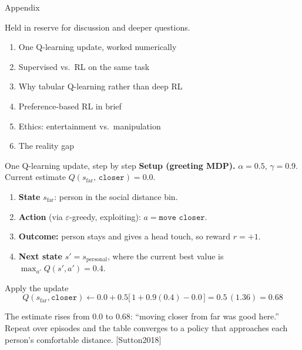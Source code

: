 \documentclass[aspectratio=169,10pt]{beamer}
\newcommand{\refnum}[1]{{\footnotesize\color{giuaccent}[#1]}}
\begin{document}
\begin{frame}{Appendix}
  \begin{center}
    \large Held in reserve for discussion and deeper questions.
  \end{center}
  \vspace{1em}
  \begin{enumerate}
    \item One Q-learning update, worked numerically
    \item Supervised vs.\ RL on the same task
    \item Why tabular Q-learning rather than deep RL
    \item Preference-based RL in brief
    \item Ethics: entertainment vs.\ manipulation
    \item The reality gap
  \end{enumerate}
\end{frame}

\begin{frame}{One Q-learning update, step by step}
  \footnotesize
  \textbf{Setup (greeting MDP).} $\alpha=0.5$, $\gamma=0.9$. Current estimate $Q(s_{\text{far}},\,\texttt{closer})=0.0$.
  \begin{enumerate}
    \item \textbf{State} $s_{\text{far}}$: person in the social distance bin.
    \item \textbf{Action} (via $\varepsilon$-greedy, exploiting): $a=\texttt{move closer}$.
    \item \textbf{Outcome:} person stays and gives a head touch, so reward $r=+1$.
    \item \textbf{Next state} $s'=s_{\text{personal}}$, where the current best value is $\max_{a'}Q(s',a')=0.4$.
  \end{enumerate}
  \vspace{0.3em}
  \begin{block}{Apply the update}
    \[
      Q(s_{\text{far}},\texttt{closer}) \leftarrow 0.0 + 0.5\big[\,1 + 0.9(0.4) - 0.0\,\big]
      = 0.5\,(1.36) = 0.68
    \]
  \end{block}
  \footnotesize The estimate rises from $0.0$ to $0.68$: ``moving closer from far was good here.'' Repeat over episodes and the table converges to a policy that approaches each person's comfortable distance. \refnum{Sutton2018}
\end{frame}
\end{document}
